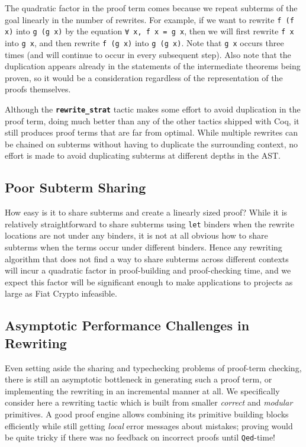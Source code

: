 \documentclass[sn-mathphys,pdflatex]{sn-jnl}%
\newcommand{\tacrewritestrat}{\textbf{\texttt{rewrite\_strat}}}
\theoremstyle{thmstyleone}%
\theoremstyle{thmstyletwo}%
\theoremstyle{thmstylethree}%
\begin{document}
The quadratic factor in the proof term comes because we repeat subterms of the goal linearly in the number of rewrites.
For example, if we want to rewrite \texttt{f (f x)} into \texttt{g (g x)} by the equation \texttt{∀ x, f x = g x}, then we will first rewrite \texttt{f x} into \texttt{g x}, and then rewrite \texttt{f (g x)} into \texttt{g (g x)}.
Note that \texttt{g x} occurs three times (and will continue to occur in every subsequent step).
Also note that the duplication appears already in the statements of the intermediate theorems being proven, so it would be a consideration regardless of the representation of the proofs themselves.

Although the \tacrewritestrat{} tactic makes some effort to avoid duplication in the proof term, doing much better than any of the other tactics shipped with Coq, it still produces proof terms that are far from optimal.
While multiple rewrites can be chained on subterms without having to duplicate the surrounding context, no effort is made to avoid duplicating subterms at different depths in the AST.

\subsection{Poor Subterm Sharing}

How easy is it to share subterms and create a linearly sized proof?
While it is relatively straightforward to share subterms using \texttt{let} binders when the rewrite locations are not under any binders, it is not at all obvious how to share subterms when the terms occur under different binders.
Hence any rewriting algorithm that does not find a way to share subterms across different contexts will incur a quadratic factor in proof-building and proof-checking time, and we expect this factor will be significant enough to make applications to projects as large as Fiat Crypto infeasible.

\subsection{Asymptotic Performance Challenges in Rewriting}\label{sec:proof-producing-rewriting:theoretical-performance}

Even setting aside the sharing and typechecking problems of proof-term checking, there is still an asymptotic bottleneck in generating such a proof term, or implementing the rewriting in an incremental manner at all.
We specifically consider here a rewriting tactic which is built from smaller \emph{correct} and \emph{modular} primitives.
A good proof engine allows combining its primitive building blocks efficiently while still getting \emph{local} error messages about mistakes;
proving would be quite tricky if there was no feedback on incorrect proofs until \texttt{Qed}-time!
\end{document}
